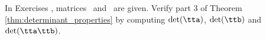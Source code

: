{\noin In Exercises }
{, matrices \tta\ and \ttb\ are given. Verify part 3 of Theorem \ref{thm:determinant_properties} 
by computing $\det(\tta)$, $\det(\ttb)$ and $\det(\tta\ttb)$.}
